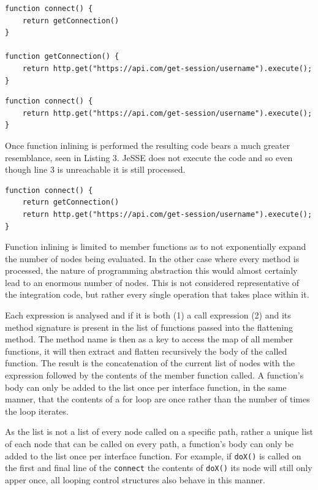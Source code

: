 \documentclass[jou,apacite]{apa6}
\begin{document}
\begin{lstlisting}[caption=Function returning call expression]
function connect() {
	return getConnection()
}

function getConnection() {
	return http.get("https://api.com/get-session/username").execute();
}
\end{lstlisting}

\begin{lstlisting}[caption=Function returning contents of previous call expression]
function connect() {
	return http.get("https://api.com/get-session/username").execute();
}
\end{lstlisting}

Once function inlining is performed the resulting code bears a much greater resemblance, seen in Listing 3. JeSSE does not execute the code and so even though line 3 is unreachable it is still processed.

\begin{lstlisting}[caption=Function returning contents of previous call expression (function inlining of nodes)]
function connect() {
	return getConnection()
	return http.get("https://api.com/get-session/username").execute();
}
\end{lstlisting}

Function inlining is limited to member functions as to not exponentially expand the number of nodes being evaluated. In the other case where every method is processed,  the nature of programming abstraction this would almost certainly lead to an enormous number of nodes. This is not considered representative of the integration code, but rather every single operation that takes place within it. 

Each expression is analysed and if it is both (1) a call expression (2) and its method signature is present in the list of functions passed into the flattening method. The method name is then as a key to access the map of all member functions, it will then extract and flatten recursively the body of the called function. The result is the concatenation of the current list of nodes with the expression followed by the contents of the member function called. A function’s body can only be added to the list once per interface function, in the same manner, that the contents of a for loop are once rather than the number of times the loop iterates. 

As the list is not a list of every node called on a specific path, rather a unique list of each node that can be called on every path, a function’s body can only be added to the list once per interface function. For example, if \texttt{doX()} is called on the first and final line of the \texttt{connect} the contents of \texttt{doX()} its node will still only apper once, all looping control structures also behave in this manner.
\end{document}
